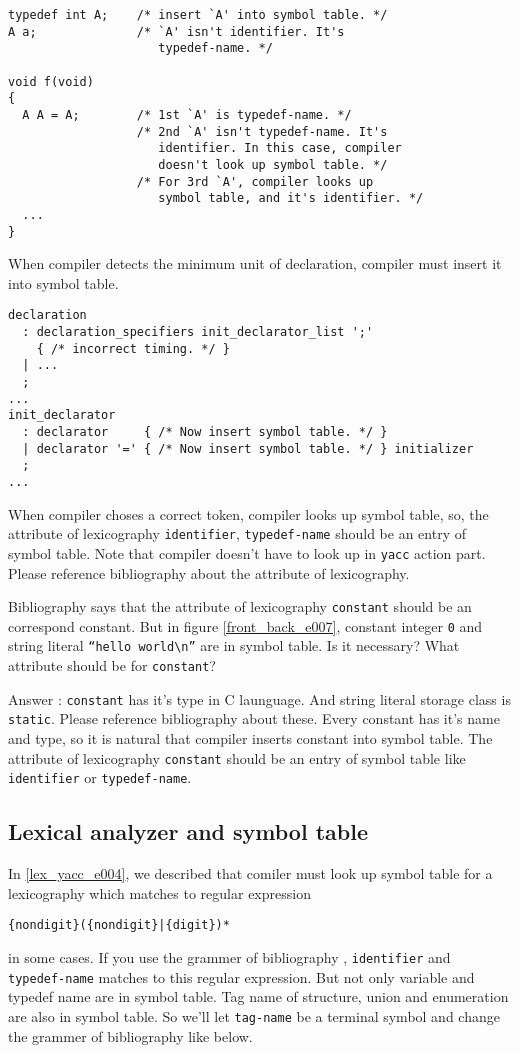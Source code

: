 \begin{verbatim}
typedef int A;    /* insert `A' into symbol table. */
A a;              /* `A' isn't identifier. It's 
                     typedef-name. */

void f(void)
{
  A A = A;        /* 1st `A' is typedef-name. */
                  /* 2nd `A' isn't typedef-name. It's
                     identifier. In this case, compiler
                     doesn't look up symbol table. */
                  /* For 3rd `A', compiler looks up 
                     symbol table, and it's identifier. */
  ...
}
\end{verbatim}
When compiler detects the minimum unit of declaration,
compiler must insert it into symbol table.

\begin{verbatim}
declaration
  : declaration_specifiers init_declarator_list ';'
    { /* incorrect timing. */ }
  | ...
  ;
...
init_declarator
  : declarator     { /* Now insert symbol table. */ }
  | declarator '=' { /* Now insert symbol table. */ } initializer
  ;
...
\end{verbatim}
When compiler choses a correct token, compiler looks up symbol
table, so, the attribute of lexicography {\tt{identifier}}, {\tt{typedef-name}}
should be an entry of symbol table.
Note that compiler doesn't have to look up in {\tt{yacc}} action part.
Please reference bibliography \cite{doragon} about the attribute
of lexicography.

\begin{QandA}
Bibliography \cite{doragon} says that
the attribute of lexicography {\tt{constant}}
should be an correspond constant. But in figure
\ref{front_back_e007}, constant integer {\tt{0}}
and string literal {\tt{``hello world\verb|\|n''}}
are in symbol table. Is it necessary? What attribute 
should be for {\tt{constant}}?

Answer : {\tt{constant}} has it's type in C launguage.
And string literal storage class is {\tt{static}}.
Please reference bibliography \cite{ISO} about these.
Every constant has it's name and type, so it is natural
that compiler inserts constant into symbol table.
The attribute of lexicography {\tt{constant}} 
should be an entry of symbol table like {\tt{identifier}}
or {\tt{typedef-name}}.
\end{QandA}

\subsection{Lexical analyzer and symbol table}
\label{lex_yacc007_e}
In \ref{lex_yacc_e004}, we described that comiler must
look up symbol table for a lexicography
which matches to regular expression
\begin{verbatim}
{nondigit}({nondigit}|{digit})*
\end{verbatim}
in some cases. If you use the grammer of bibliography \cite{ISO},
{\tt identifier} and {\tt typedef-name} matches to this regular
expression. But not only variable and typedef name are in symbol table.
Tag name of structure, union and enumeration are also in symbol table.
So we'll let {\tt tag-name} be a terminal symbol and change the
grammer of bibliography \cite{ISO} like below.

